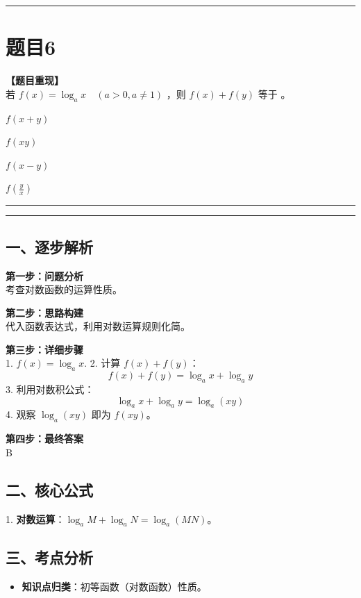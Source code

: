 \documentclass[12pt, a4paper]{ctexart}
\newcommand{\TopSeparator}{
    \par\noindent\rule{\textwidth}{1.5pt}\vspace{0.5em} %
}
\newcommand{\AnalysisSeparator}{
    \par\noindent\rule{\textwidth}{0.5pt}\vspace{0.2em}\hrule\vspace{0.5em} %
}
\newenvironment{RedAnalysis}{
    \par
    \color{red} %
}{
    \par
    \color{black} %
}
\newcommand{\choicesFour}[4]{
    \begin{enumerate}[label=\Alph*., itemsep=0pt, parsep=0pt, topsep=5pt, labelsep=0.5em]
        \begin{minipage}{0.22\linewidth} \item #1 \end{minipage}
        \begin{minipage}{0.22\linewidth} \item #2 \end{minipage}
        \begin{minipage}{0.22\linewidth} \item #3 \end{minipage}
        \begin{minipage}{0.22\linewidth} \item #4 \end{minipage}
    \end{enumerate}
}
\begin{document}
\vspace{2em}

\TopSeparator
\section*{题目6}

\textbf{【题目重现】} \\
若 $ f(x) = \log_{a} x \quad (a > 0, a \neq 1) $ ，则 $ f(x) + f(y) $ 等于 \underline{\hspace{1cm}}。
\choicesFour{$ f(x+y) $}{$ f(xy) $}{$ f(x-y) $}{$ f(\frac{y}{x}) $}

\AnalysisSeparator

\begin{RedAnalysis}

\subsection*{一、逐步解析}

\textbf{第一步：问题分析} \\
考查对数函数的运算性质。

\textbf{第二步：思路构建} \\
代入函数表达式，利用对数运算规则化简。

\textbf{第三步：详细步骤} \\
1. $f(x) = \log_a x$.
2. 计算 $f(x) + f(y)$：
   \[ f(x) + f(y) = \log_a x + \log_a y \]
3. 利用对数积公式：
   \[ \log_a x + \log_a y = \log_a (xy) \]
4. 观察 $\log_a (xy)$ 即为 $f(xy)$。

\textbf{第四步：最终答案} \\
B

\subsection*{二、核心公式}
1. \textbf{对数运算}：$\log_a M + \log_a N = \log_a (MN)$。

\subsection*{三、考点分析}
\begin{itemize}
    \item \textbf{知识点归类}：初等函数（对数函数）性质。
\end{itemize}

\end{RedAnalysis}

\vspace{2em}
\end{document}
